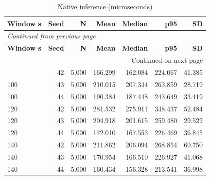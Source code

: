 \documentclass[10pt,a4paper]{article}
\begin{document}
\begin{longtable}{@{}lrrrrrr@{}}
\caption{Native inference (microseconds)}\\
\toprule
\textbf{Window s} & \textbf{Seed} & \textbf{N} & \textbf{Mean} & \textbf{Median} & \textbf{p95} & \textbf{SD} \\
\midrule\endfirsthead
\multicolumn{7}{l}{\small\itshape Continued from previous page}\\
\toprule
\textbf{Window s} & \textbf{Seed} & \textbf{N} & \textbf{Mean} & \textbf{Median} & \textbf{p95} & \textbf{SD} \\
\midrule\endhead
\midrule\multicolumn{7}{r}{\small Continued on next page}\\\endfoot
\bottomrule\endlastfoot
100 & 42 & 5,000 & 166.299 & 162.084 & 224.067 & 41.385 \\
100 & 43 & 5,000 & 210.015 & 207.344 & 263.859 & 28.719 \\
100 & 44 & 5,000 & 190.384 & 187.448 & 243.649 & 33.419 \\
120 & 42 & 5,000 & 281.532 & 275.911 & 348.437 & 52.484 \\
120 & 43 & 5,000 & 204.918 & 201.615 & 259.480 & 29.522 \\
120 & 44 & 5,000 & 172.010 & 167.553 & 226.469 & 36.845 \\
140 & 42 & 5,000 & 211.862 & 206.094 & 268.854 & 60.750 \\
140 & 43 & 5,000 & 170.954 & 166.510 & 226.927 & 41.068 \\
140 & 44 & 5,000 & 160.434 & 156.328 & 213.541 & 36.998 \\
\end{longtable}\endgroup
\begingroup\small\setlength{\tabcolsep}{4pt}\renewcommand{\arraystretch}{1.12}
\end{document}
